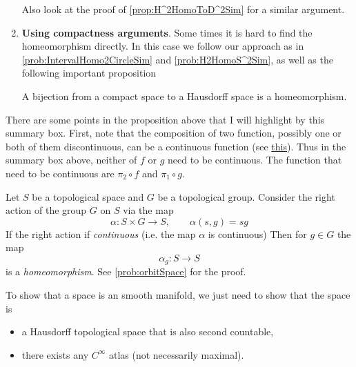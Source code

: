 \begin{summary}
\begin{enumerate}
\begin{itemize}
		\end{itemize}
					
		Also look at the proof of \autoref{prop:H^2HomoToD^2Sim} for a similar argument.
		
		\item \textbf{Using compactness arguments}. Some times it is hard to find the homeomorphism directly. In this case we follow our approach as in \autoref{prob:IntervalHomo2CircleSim} and \autoref{prob:H2HomoS^2Sim}, as well as the following important proposition
		\begin{proposition}
			A bijection from a compact space to a Hausdorff space is a homeomorphism.
		\end{proposition}
	\end{enumerate}
\end{summary}

\begin{summary}
	There are some points in the proposition above that I will highlight by this summary box. First, note that the composition of two function, possibly one or both of them discontinuous, can be a continuous function (see \href{https://math.stackexchange.com/questions/3080559/composition-of-discontinuous-functions#:~:text=A%20simple%20example%20of%20the,functions%20giving%20a%20continuous%20one.&text=g(x)%3Dx(,x)%2B%E2%8C%8Ax%E2%8C%8B.&text=(g%E2%88%98f)(x,discontinuous%20maps%20may%20be%20continuous.}{this}). Thus in the summary box above, neither of $ f $ or $ g $ need to be continuous. The function that need to be continuous are $ \pi_2\circ f $ and $ \pi_1\circ g $.
\end{summary}


\begin{summary}
	Let $ S $ be a topological space and $ G $ be a topological group. Consider the right action of the group $ G $ on $ S $ via the map 
	\[ \alpha : S \times G \to S, \qquad \alpha(s,g) = sg \]
	If the right action if \emph{continuous} (i.e. the map $ \alpha $ is continuous) Then for $ g \in G $ the map
	\[ \alpha_g: S \to S \]
	is a \emph{homeomorphism}. See \autoref{prob:orbitSpace} for the proof.
\end{summary}


\begin{summary}
	\label{summary:ShowingSpaceIsSmoothManifold}
	To show that a space is an smooth manifold, we just need to show that the space is
	\begin{itemize}
		\item a Hausdorff topological space that is also second countable,
		\item there exists any $ C^\infty $ atlas (not necessarily maximal).
	\end{itemize}
\end{summary}

\newpage

